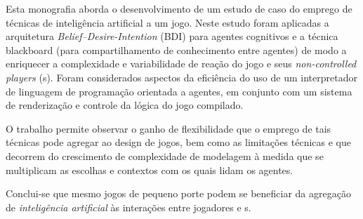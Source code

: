 Esta monografia aborda o desenvolvimento de um estudo de caso do emprego de técnicas de inteligência artificial a um jogo. Neste estudo foram aplicadas a arquitetura \emph{Belief--Desire-Intention} (BDI) para agentes cognitivos e a técnica blackboard (para compartilhamento de conhecimento entre agentes) de modo a enriquecer a complexidade e variabilidade de reação do jogo e seus \emph{non-controlled players} (\npc{}s). Foram considerados aspectos da eficiência do uso de um interpretador de linguagem de programação orientada a agentes, em conjunto com um sistema de renderização e controle da lógica do jogo compilado.

O trabalho permite observar o ganho de flexibilidade que o emprego de tais técnicas pode agregar ao design de jogos, bem como as limitações técnicas e que decorrem do crescimento de complexidade de modelagem à medida que se multiplicam as escolhas e contextos com os quais lidam os agentes.

Conclui-se que mesmo jogos de pequeno porte podem se beneficiar da
agregação de \emph{inteligência artificial} às interações entre jogadores
e \npc{}s.


